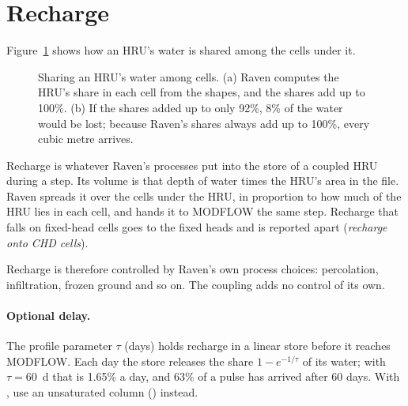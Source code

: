 \section{Recharge}\label{sec:urecharge}
Figure~\ref{fig:ulinking} shows how an HRU's water is shared among the cells under it.
\begin{figure}[!htbp]\centering
\caption{Sharing an HRU's water among cells. (a) Raven computes the HRU's share in each cell from the shapes, and the shares add up to 100\%. (b) If the shares added up to only 92\%, 8\% of the water would be lost; because Raven's shares always add up to 100\%, every cubic metre arrives.}\label{fig:ulinking}
\end{figure}
Recharge is whatever Raven's processes put into the  store of a coupled HRU during a step. Its volume is
that depth of water times the HRU's area in the  file. Raven spreads it over the cells under the HRU, in
proportion to how much of the HRU lies in each cell, and hands it to MODFLOW the same step. Recharge that falls on
fixed-head cells goes to the fixed heads and is reported apart (\emph{recharge onto CHD cells}).

Recharge is therefore controlled by Raven's own process choices: percolation, infiltration, frozen ground and so on. The
coupling adds no control of its own.

\paragraph{Optional delay.} The profile parameter  $\tau$ (days) holds recharge in a linear store
before it reaches MODFLOW. Each day the store releases the share $1-e^{-1/\tau}$ of its water; with $\tau=60$~d that is
1.65\% a day, and 63\% of a pulse has arrived after 60 days. With , use an unsaturated column
() instead.

